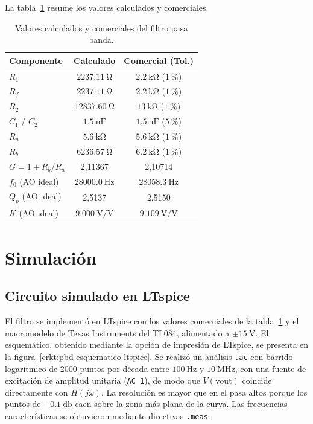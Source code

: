 La tabla~\ref{tab:pbd-componentes} resume los valores calculados y comerciales.

\begin{table}[!ht]
  \centering
  \begin{tabular}{|l|c|c|}
    \hline
    Componente & Calculado & Comercial (Tol.) \\
    \hline
    $R_1$ & $\SI{2237.11}{\ohm}$ & $\SI{2.2}{\kilo\ohm}$ ($\SI{1}{\percent}$) \\
    $R_f$ & $\SI{2237.11}{\ohm}$ & $\SI{2.2}{\kilo\ohm}$ ($\SI{1}{\percent}$) \\
    $R_2$ & $\SI{12837.60}{\ohm}$ & $\SI{13}{\kilo\ohm}$ ($\SI{1}{\percent}$) \\
    $C_1$ / $C_2$ & $\SI{1.5}{\nano\farad}$ & $\SI{1.5}{\nano\farad}$ ($\SI{5}{\percent}$) \\
    $R_a$ & $\SI{5.6}{\kilo\ohm}$ & $\SI{5.6}{\kilo\ohm}$ ($\SI{1}{\percent}$) \\
    $R_b$ & $\SI{6236.57}{\ohm}$ & $\SI{6.2}{\kilo\ohm}$ ($\SI{1}{\percent}$) \\
    \hline
    $G = 1 + R_b/R_a$ & 2,11367 & 2,10714 \\
    $f_0$ (AO ideal) & $\SI{28000.0}{\hertz}$ & $\SI{28058.3}{\hertz}$ \\
    $Q_p$ (AO ideal) & 2,5137 & 2,5150 \\
    $K$ (AO ideal) & $\SI{9.000}{\volt/\volt}$ & $\SI{9.109}{\volt/\volt}$ \\
    \hline
  \end{tabular}
  \caption{Valores calculados y comerciales del filtro pasa banda.}
  \label{tab:pbd-componentes}
\end{table}

\section{Simulación}
\label{sec:pbd-simulacion}

\subsection{Circuito simulado en LTspice}
\label{subsec:pbd-sim-circuito}

El filtro se implementó en LTspice con los valores comerciales de la tabla~\ref{tab:pbd-componentes} y el
macromodelo de Texas Instruments del TL084, alimentado a $\pm\SI{15}{\volt}$. El esquemático, obtenido mediante la
opción de impresión de LTspice, se presenta en la figura~\ref{crkt:pbd-esquematico-ltspice}. Se realizó un análisis
\texttt{.ac} con barrido logarítmico de 2000 puntos por década entre $\SI{100}{\hertz}$ y $\SI{10}{\mega\hertz}$, con
una fuente de excitación de amplitud unitaria (\texttt{AC 1}), de modo que $V(\text{vout})$ coincide directamente con
$H(j\omega)$. La resolución es mayor que en el pasa altos porque los puntos de $\SI{-0.1}{\decibel}$ caen sobre la
zona más plana de la curva. Las frecuencias características se obtuvieron mediante directivas \texttt{.meas}.

